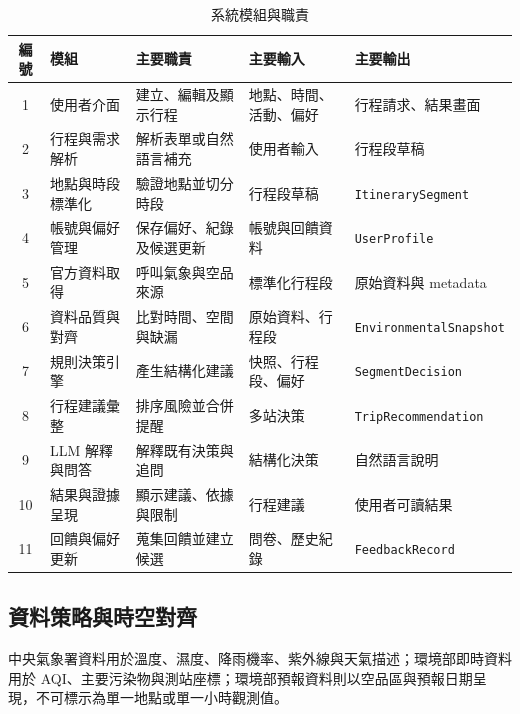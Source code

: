 \documentclass[conference]{IEEEtran}
\begin{document}
\begin{table}[t]
\caption{系統模組與職責}
\label{tab:modules}
\centering
\scriptsize
\begin{tabular}{@{}c>{\raggedright\arraybackslash}p{}
>{\raggedright\arraybackslash}p{}
>{\raggedright\arraybackslash}p{}
>{\raggedright\arraybackslash}p{}@{}}
\toprule
\textbf{編號} & \textbf{模組} & \textbf{主要職責} & \textbf{主要輸入} & \textbf{主要輸出} \\
\midrule
1 & 使用者介面 & 建立、編輯及顯示行程 & 地點、時間、活動、偏好 & 行程請求、結果畫面 \\
2 & 行程與需求解析 & 解析表單或自然語言補充 & 使用者輸入 & 行程段草稿 \\
3 & 地點與時段標準化 & 驗證地點並切分時段 & 行程段草稿 & \texttt{ItinerarySegment} \\
4 & 帳號與偏好管理 & 保存偏好、紀錄及候選更新 & 帳號與回饋資料 & \texttt{UserProfile} \\
5 & 官方資料取得 & 呼叫氣象與空品來源 & 標準化行程段 & 原始資料與 metadata \\
6 & 資料品質與對齊 & 比對時間、空間與缺漏 & 原始資料、行程段 & \texttt{EnvironmentalSnapshot} \\
7 & 規則決策引擎 & 產生結構化建議 & 快照、行程段、偏好 & \texttt{SegmentDecision} \\
8 & 行程建議彙整 & 排序風險並合併提醒 & 多站決策 & \texttt{TripRecommendation} \\
9 & LLM 解釋與問答 & 解釋既有決策與追問 & 結構化決策 & 自然語言說明 \\
10 & 結果與證據呈現 & 顯示建議、依據與限制 & 行程建議 & 使用者可讀結果 \\
11 & 回饋與偏好更新 & 蒐集回饋並建立候選 & 問卷、歷史紀錄 & \texttt{FeedbackRecord} \\
\bottomrule
\end{tabular}
\end{table}

\subsection{資料策略與時空對齊}
中央氣象署資料用於溫度、濕度、降雨機率、紫外線與天氣描述；環境部即時資料用於 AQI、主要污染物與測站座標；環境部預報資料則以空品區與預報日期呈現，不可標示為單一地點或單一小時觀測值。
\end{document}
